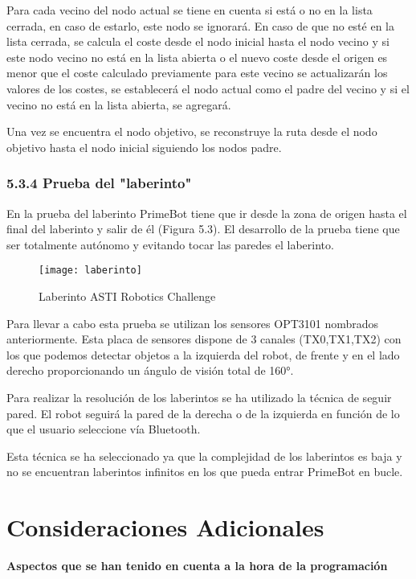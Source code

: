 Para cada vecino del nodo actual se tiene en cuenta si está o no en la lista cerrada, en caso de estarlo, este nodo se ignorará.
En caso de que no esté en la lista cerrada, se calcula el coste desde el nodo inicial hasta el nodo vecino y si este nodo vecino no está en la lista abierta o el nuevo coste desde el origen es menor que el coste calculado previamente para este vecino se actualizarán los valores de los costes, se establecerá el nodo actual como el padre del vecino y si el vecino no está en la lista abierta, se agregará.

Una vez se encuentra el nodo objetivo, se reconstruye la ruta desde el nodo objetivo hasta el nodo inicial siguiendo los nodos padre.

\subsubsection{5.3.4 Prueba del "laberinto"}\label{laberinto}

En la prueba del laberinto PrimeBot tiene que ir desde la zona de origen hasta el final del laberinto y salir de él (Figura 5.3).
El desarrollo de la prueba tiene que ser totalmente autónomo y evitando tocar las paredes el laberinto.

\begin{figure}[h]
	\centering
	\texttt{[image: laberinto]}
	\caption{Laberinto ASTI Robotics Challenge}
	\label{fig:5.3}
\end{figure}

Para llevar a cabo esta prueba se utilizan los sensores OPT3101 nombrados anteriormente. 
Esta placa de sensores dispone de 3 canales (TX0,TX1,TX2) con los que podemos detectar objetos a la izquierda del robot, de frente y en el lado derecho proporcionando un ángulo de visión total de 160°.

Para realizar la resolución de los laberintos se ha utilizado la técnica de seguir pared.
El robot seguirá la pared de la derecha o de la izquierda en función de lo que el usuario seleccione vía Bluetooth.

Esta técnica se ha seleccionado ya que la complejidad de los laberintos es baja y no se encuentran laberintos infinitos en los que pueda entrar PrimeBot en bucle.
\newpage
\section{Consideraciones Adicionales}\label{consideraciones}

\textbf{Aspectos que se han tenido en cuenta a la hora de la programación}

